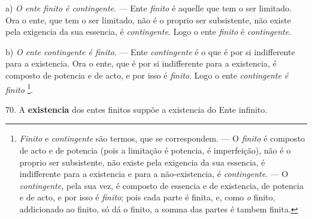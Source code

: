 a) \emph{O ente finito é contingente}. --- Ente \emph{finito} é aquelle que tem o ser limitado. Ora o ente, que tem o ser limitado, não é o proprio ser subsistente, não existe pela exigencia da sua essencia, é \emph{contingente}. Logo o ente \emph{finito} é \emph{contingente}.

b) \emph{O ente contingente é finito}. --- Ente \emph{contingente} é o que é por si indifferente para a existencia. Ora o ente, que é por si indifferente para a existencia, é composto de potencia e de acto, e por isso é \emph{finito}. Logo o ente \emph{contingente é finito} \footnote{\emph{Finito} e \emph{contingente} são termos, que se correspondem. --- O \emph{finito} é composto de acto e de potencia (pois a limitação é potencia, é imperfeição), não é o proprio ser subsistente, não existe pela exigencia da sua essencia, é indifferente para a existencia e para a não-existencia, é \emph{contingente}. --- O \emph{contingente}, pela sua vez, é composto de essencia e de existencia, de potencia e de acto, e por isso é \emph{finito}; pois cada parte é finita, e, como \emph{o} finito, addicionado ao finito, só dá o finito, a somma das partes é tambem finita.}.

70. A \textbf{existencia} dos entes finitos suppõe a existencia do Ente infinito.

